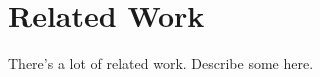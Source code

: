 \chapter{Related Work}
\label{sec:related_work}
 There's a lot of related work.  Describe some here.

